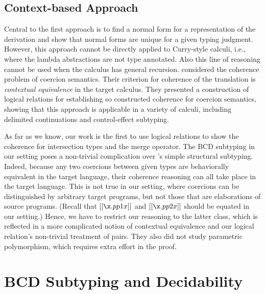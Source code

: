 \subsection{Context-based Approach}

Central to the first approach is to find a normal form for a representation of
the derivation and show that normal forms are unique for a given typing
judgment. However, this approach cannot be directly applied to Curry-style
calculi, i.e., where the lambda abstractions are not type annotated. Also this
line of reasoning cannot be used when the calculus has general recursion.
\citet{biernacki2015logical} considered the coherence problem of coercion
semantics. Their criterion for coherence of the translation is
\emph{contextual equivalence} in the target calculus. They presented a
construction of logical relations for establishing so constructed coherence for
coercion semantics, showing that this approach is applicable in a variety of
calculi, including delimited continuations and control-effect subtyping.

As far as we know, our work is the first to use logical relations to show the
coherence for intersection types and the merge operator. The BCD subtyping in
our setting poses a non-trivial complication over
\citeauthor{biernacki2015logical}'s simple structural subtyping. Indeed, because
any two coercions between given types are behaviorally equivalent in the target
language, their coherence reasoning can all take place in the target language.
This is not true in our setting, where coercions can be distinguished by
arbitrary target programs, but not those that are elaborations of source
programs. (Recall that $ [[\x . pp1 x]]    $ and $ [[ \x . pp2 x]]    $ should be equated in our setting.)
Hence, we have to restrict our reasoning to the latter class, which is reflected
in a more complicated notion of contextual equivalence and our logical
relation's non-trivial treatment of pairs. They also did not study parametric
polymorphism, which requires extra effort in the proof.


\section {BCD Subtyping and Decidability}


